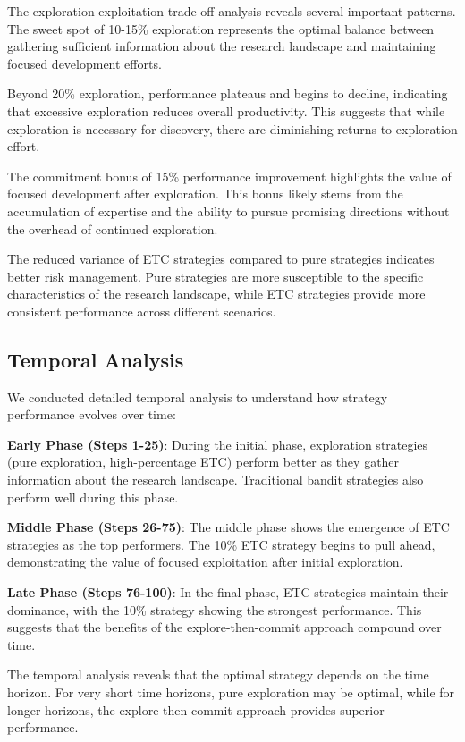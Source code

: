 \documentclass[letterpaper]{article}
\begin{document}
The exploration-exploitation trade-off analysis reveals several important patterns. The sweet spot of 10-15\% exploration represents the optimal balance between gathering sufficient information about the research landscape and maintaining focused development efforts.

Beyond 20\% exploration, performance plateaus and begins to decline, indicating that excessive exploration reduces overall productivity. This suggests that while exploration is necessary for discovery, there are diminishing returns to exploration effort.

The commitment bonus of 15\% performance improvement highlights the value of focused development after exploration. This bonus likely stems from the accumulation of expertise and the ability to pursue promising directions without the overhead of continued exploration.

The reduced variance of ETC strategies compared to pure strategies indicates better risk management. Pure strategies are more susceptible to the specific characteristics of the research landscape, while ETC strategies provide more consistent performance across different scenarios.

\subsection{Temporal Analysis}

We conducted detailed temporal analysis to understand how strategy performance evolves over time:

\textbf{Early Phase (Steps 1-25)}: During the initial phase, exploration strategies (pure exploration, high-percentage ETC) perform better as they gather information about the research landscape. Traditional bandit strategies also perform well during this phase.

\textbf{Middle Phase (Steps 26-75)}: The middle phase shows the emergence of ETC strategies as the top performers. The 10\% ETC strategy begins to pull ahead, demonstrating the value of focused exploitation after initial exploration.

\textbf{Late Phase (Steps 76-100)}: In the final phase, ETC strategies maintain their dominance, with the 10\% strategy showing the strongest performance. This suggests that the benefits of the explore-then-commit approach compound over time.

The temporal analysis reveals that the optimal strategy depends on the time horizon. For very short time horizons, pure exploration may be optimal, while for longer horizons, the explore-then-commit approach provides superior performance.
\end{document}
